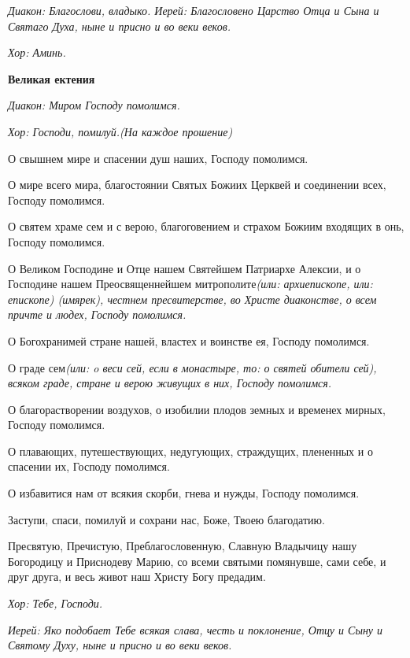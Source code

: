 \itshape Диакон:\normalfont{} Благослови, владыко.
\itshape Иерей:\normalfont{} Благословено Царство Отца и Сына и Святаго Духа, ныне и присно и во веки веков. 


\itshape Хор:\normalfont{} Аминь.


\medskip
\bfseries Великая ектения\normalfont{}


\itshape Диакон:\normalfont{} Миром Господу помолимся. 


\itshape Хор:\normalfont{} Господи, помилуй.\itshape  (На каждое прошение)\normalfont{}


О свышнем мире и спасении душ наших, Господу помолимся. 


О мире всего мира, благостоянии Святых Божиих Церквей и соединении всех, Господу помолимся.


О святем храме сем и с верою, благоговением и страхом Божиим входящих в онь, Господу помолимся. 


О Великом Господине и Отце нашем Святейшем Патриархе Алексии, и о Господине нашем Преосвященнейшем митрополите\itshape  (или:\normalfont{} архиепископе\itshape , или:\normalfont{} епископе\itshape ) (имярек)\normalfont{}, честнем пресвитерстве, во Христе диаконстве, о всем причте и людех, Господу помолимся. 


О Богохранимей стране нашей, властех и воинстве ея, Господу помолимся.


О граде сем\itshape  (или:\normalfont{} o веси сей\itshape , если в монастыре, то: о\normalfont{} святей обители сей), всяком граде, стране и верою живущих в них, Господу помолимся. 


О благорастворении воздухов, о изобилии плодов земных и временех мирных, Господу помолимся.


О плавающих, путешествующих, недугующих, страждущих, плененных и о спасении их, Господу помолимся. 


О избавитися нам от всякия скорби, гнева и нужды, Господу помолимся. 


Заступи, спаси, помилуй и сохрани нас, Боже, Твоею благодатию. 


Пресвятую, Пречистую, Преблагословенную, Славную Владычицу нашу Богородицу и Приснодеву Марию, со всеми святыми помянувше, сами себе, и друг друга, и весь живот наш Христу Богу предадим. 


\itshape Хор:\normalfont{} Тебе, Господи. 


\itshape Иерей:\normalfont{} Яко подобает Тебе всякая слава, честь и поклонение, Отцу и Сыну и Святому Духу, ныне и присно и во веки веков. 


